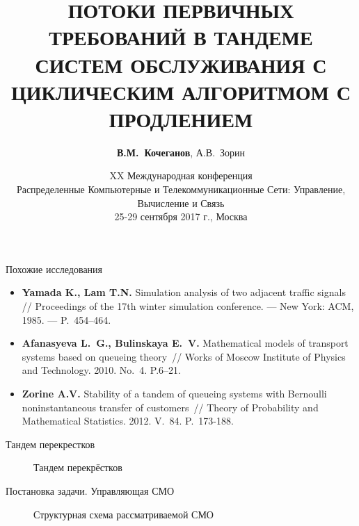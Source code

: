 \documentclass[10pt]{beamer}
\begin{document}
\title[ПОТОКИ ПЕРВИЧНЫХ ТРЕБОВАНИЙ...]{\normalsize \color{blue} ПОТОКИ ПЕРВИЧНЫХ ТРЕБОВАНИЙ В ТАНДЕМЕ СИСТЕМ ОБСЛУЖИВАНИЯ С ЦИКЛИЧЕСКИМ АЛГОРИТМОМ С ПРОДЛЕНИЕМ}

\author[В.М.~Кочеганов, А.В.~Зорин (ННГУ)]{\textbf{В.М.~Кочеганов}, А.В.~Зорин}
\date[25-29.09.2017]{
XX Международная конференция \\ 
Распределенные Компьютерные и Телекоммуникационные Сети: Управление, Вычисление и Связь\\
25-29 сентября 2017 г., Москва
}

\begin{frame}
\titlepage
\end{frame}



\begin{frame}{Похожие исследования}
    \begin{itemize}
    \item \textbf{Yamada K., Lam T.N.} Simulation analysis of two adjacent traffic signals // Proceedings of the 17th winter simulation conference. --- New York: ACM, 1985. --- P.~454–464.
    \item \textbf{Afanasyeva L.~G., Bulinskaya E.~V. } Mathematical models of transport systems based on queueing theory~// Works of Moscow Institute of Physics and Technology. 2010. No.~4. P.6--21. 
\item \textbf{Zorine A.V.} Stability of a tandem of queueing systems with Bernoulli noninstantaneous transfer of
  customers~// Theory of Probability and Mathematical Statistics. 2012. V.~84. P.~173-188.
    \end{itemize}
\end{frame}


\begin{frame}{Тандем перекрестков}
  \begin{figure}[h]
    \centering
    \caption{Тандем перекрёстков}
    \label{VK:fig:1}
  \end{figure}
\end{frame} 


\begin{frame}{Постановка задачи. Управляющая СМО}
  \begin{figure}[h]
    \centering
    \caption{Структурная схема рассматриваемой СМО}
    \label{VK:fig:2}
  \end{figure}
\end{frame} 
\end{document}
